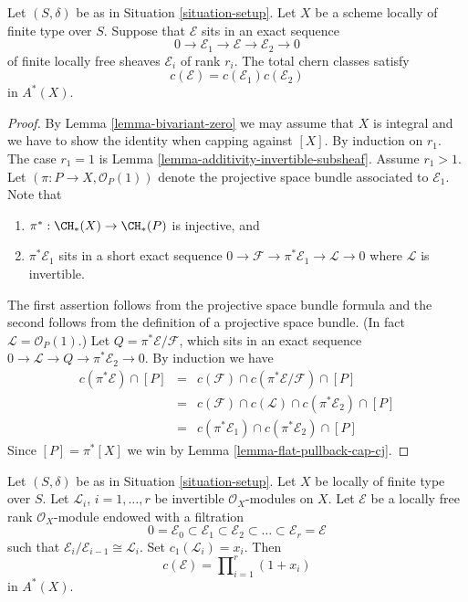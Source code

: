 \begin{lemma}
\label{lemma-additivity-chern-classes}
Let $(S, \delta)$ be as in Situation \ref{situation-setup}.
Let $X$ be a scheme locally of finite type over $S$.
Suppose that ${\mathcal E}$ sits in an
exact sequence
$$
0
\to
{\mathcal E}_1
\to
{\mathcal E}
\to
{\mathcal E}_2
\to
0
$$
of finite locally free sheaves $\mathcal{E}_i$ of rank $r_i$.
The total chern classes satisfy
$$
c({\mathcal E}) = c({\mathcal E}_1) c({\mathcal E}_2)
$$
in $A^*(X)$.
\end{lemma}

\begin{proof}
By Lemma \ref{lemma-bivariant-zero} we may assume that $X$ is integral
and we have to show the identity when capping against $[X]$.
By induction on $r_1$. The case $r_1 = 1$ is
Lemma \ref{lemma-additivity-invertible-subsheaf}.
Assume $r_1 > 1$. Let $(\pi : P \to X, \mathcal{O}_P(1))$
denote the projective space bundle associated to $\mathcal{E}_1$. Note that
\begin{enumerate}
\item $\pi^* : \CH_*(X) \to \CH_*(P)$ is injective, and
\item $\pi^*\mathcal{E}_1$ sits in a short exact sequence
$0 \to \mathcal{F} \to \pi^*\mathcal{E}_1 \to \mathcal{L} \to 0$
where $\mathcal{L}$ is invertible.
\end{enumerate}
The first assertion follows from the projective space bundle formula
and the second follows from the definition of a projective space bundle.
(In fact $\mathcal{L} = \mathcal{O}_P(1)$.)
Let $Q = \pi^*\mathcal{E}/\mathcal{F}$, which sits in an
exact sequence $0 \to \mathcal{L} \to Q \to \pi^*\mathcal{E}_2 \to 0$.
By induction we have
\begin{eqnarray*}
c(\pi^*\mathcal{E}) \cap [P]
& = &
c(\mathcal{F}) \cap c(\pi^*\mathcal{E}/\mathcal{F}) \cap [P] \\
& = &
c(\mathcal{F}) \cap c(\mathcal{L}) \cap c(\pi^*\mathcal{E}_2) \cap [P] \\
& = &
c(\pi^*\mathcal{E}_1) \cap c(\pi^*\mathcal{E}_2) \cap [P]
\end{eqnarray*}
Since $[P] = \pi^*[X]$ we
win by Lemma \ref{lemma-flat-pullback-cap-cj}.
\end{proof}

\begin{lemma}
\label{lemma-chern-filter-by-linebundles}
Let $(S, \delta)$ be as in Situation \ref{situation-setup}.
Let $X$ be locally of finite type over $S$.
Let ${\mathcal L}_i$, $i = 1, \ldots, r$ be invertible
$\mathcal{O}_X$-modules on $X$.
Let $\mathcal{E}$ be a locally free rank
$\mathcal{O}_X$-module endowed with a filtration
$$
0 = \mathcal{E}_0 \subset \mathcal{E}_1 \subset \mathcal{E}_2
\subset \ldots \subset \mathcal{E}_r = \mathcal{E}
$$
such that $\mathcal{E}_i/\mathcal{E}_{i - 1} \cong \mathcal{L}_i$.
Set $c_1({\mathcal L}_i) = x_i$. Then
$$
c(\mathcal{E})
=
\prod\nolimits_{i = 1}^r (1 + x_i)
$$
in $A^*(X)$.
\end{lemma}

